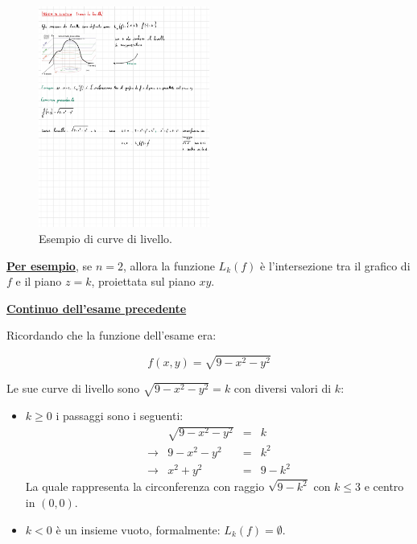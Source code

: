\documentclass[a4paper]{article}
\begin{document}
	\begin{figure}[!htp]
		\centering
		\includegraphics[width=0.5\textwidth]{img/insiemi_di_livello.pdf}
		\caption{Esempio di curve di livello.}
	\end{figure}

	\noindent
	\textcolor{Green4}{\textbf{\underline{Per esempio}}}, se $n = 2$, allora la funzione $L_{k}\left(f\right)$ è l'intersezione tra il grafico di $f$ e il piano $z = k$, proiettata sul piano $xy$.\newline
	
	\noindent
	\textcolor{Red3}{\textbf{\underline{Continuo dell'esame precedente}}}\newline
	
	\noindent
	Ricordando che la funzione dell'esame era:
	
	\begin{equation*}
		f\left(x,y\right) = \sqrt{9 - x^{2} - y^{2}}
	\end{equation*}

	\noindent
	Le sue curve di livello sono $\sqrt{9 - x^{2} - y^{2}} = k$ con diversi valori di $k$:
	
	\begin{itemize}
		\item $k \ge 0$ i passaggi sono i seguenti:
		\begin{equation*}
			\begin{array}{lrll}
								& \sqrt{9 - x^{2} - y^{2}} 	& = & k \\
				\longrightarrow	& 9 - x^{2} - y^{2}			& = & k^{2} \\
				\longrightarrow	& x^{2} + y^{2}				& = & 9 - k^{2}
			\end{array}
		\end{equation*}
		La quale rappresenta la circonferenza con raggio $\sqrt{9 - k^{2}}$ con $k \le 3$ e centro in $\left(0,0\right)$.
		
		\item $k < 0$ è un insieme vuoto, formalmente: $L_{k}\left(f\right) = \emptyset$.
	\end{itemize}
\end{document}

